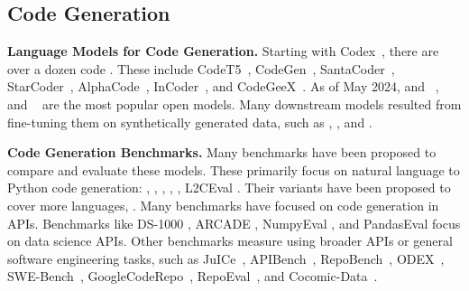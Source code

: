 \subsection{Code Generation}
\noindent \textbf{Language Models for Code Generation.} 
Starting with Codex~\citep{chen2021evaluating}, there are over a dozen code \llms{}. These include CodeT5~\citep{wang2021codet5, wang2023codet5+}, CodeGen~\citep{nijkamp2022codegen}, SantaCoder~\citep{allal2023santacoder}, StarCoder~\citep{li2023starcoder}, AlphaCode~\citep{li2022competition}, InCoder~\citep{fried2022incoder}, and CodeGeeX~\citep{zheng2023codegeex}. 
As of May 2024, \llamabase{} and \deepseek{}~\citep{bi2024deepseek}, \starcoder{}~\cite{starcoder2,li2023starcoder} and \cllama{}~\citep{roziere2023code} are the most popular open models. 
Many downstream models resulted from fine-tuning them on synthetically generated data, such as \wizardlong{} \citep{luo2023wizardcoder}, \magicoders{} \citep{wei2023magicoder}, and \phind{}.

\vspace{1pt}
\noindent \textbf{Code Generation Benchmarks.} 
Many benchmarks have been proposed to compare and evaluate these models. 
These primarily focus on natural language to Python code generation: 
\humaneval{} \citep{chen2021evaluating}, 
\humanevalplus{} \citep{liu2023your}, 
\apps{} \citep{hendrycks2021measuring}, 
\contests{} \citep{li2022competition}, 
\mbpp{} \citep{austin2021program}, 
L2CEval \citep{ni2023l2ceval}. 
Their variants have been proposed to cover more languages, \citep{wang2022recode, zheng2023codegeex, cassano2022multipl, athiwaratkun2022multi}.
Many benchmarks have focused on code generation in APIs. Benchmarks like DS-1000 \citep{lai2023ds}, ARCADE \citep{yin2022natural}, NumpyEval \citep{zhang2023toolcoder}, and PandasEval \citep{jain2022jigsaw} focus on data science APIs. 
Other benchmarks measure using broader APIs or 
general software engineering tasks, such as JuICe~\citep{agashe2019juice}, APIBench~\citep{patil2023gorilla}, RepoBench~\citep{liu2023repobench}, ODEX~\citep{wang2022execution}, SWE-Bench~\citep{jimenez2023swe}, GoogleCodeRepo~\citep{shrivastava2023repository}, RepoEval~\citep{zhang2023repocoder}, and Cocomic-Data~\citep{ding2022cocomic}.~

